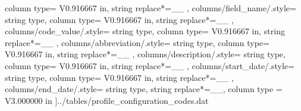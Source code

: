\begin{landscape}
{            column type= V{0.916667 in}, 
            string replace*={_}{\_}
        },
    columns/field_name/.style={
            string type, 
            column type= V{0.916667 in}, 
            string replace*={_}{\_}
        },
    columns/code_value/.style={
            string type, 
            column type= V{0.916667 in}, 
            string replace*={_}{\_}
        },
    columns/abbreviation/.style={
            string type, 
            column type= V{0.916667 in}, 
            string replace*={_}{\_}
        },
    columns/description/.style={
            string type, 
            column type= V{0.916667 in}, 
            string replace*={_}{\_}
        },
    columns/start_date/.style={
            string type, 
            column type= V{0.916667 in}, 
            string replace*={_}{\_}
        },
    columns/end_date/.style={
            string type, 
            string replace*={_}{\_},
            column type = V{3.000000 in}
        }
    ]{../tables/profile_configuration_codes.dat}
\end{landscape}
